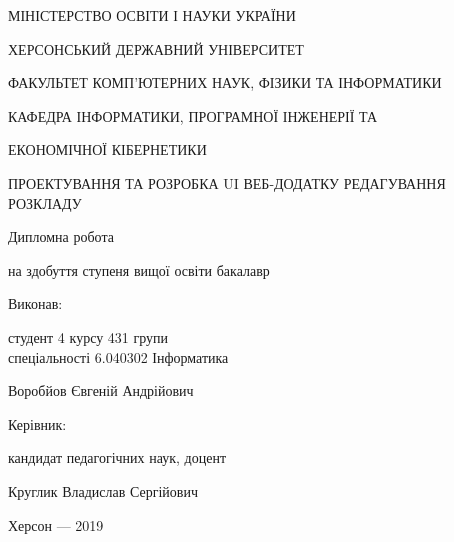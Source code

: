 \thispagestyle{empty}

{\centering
МІНІСТЕРСТВО ОСВІТИ І НАУКИ УКРАЇНИ

ХЕРСОНСЬКИЙ ДЕРЖАВНИЙ УНІВЕРСИТЕТ

ФАКУЛЬТЕТ КОМП'ЮТЕРНИХ НАУК, ФІЗИКИ ТА ІНФОРМАТИКИ

КАФЕДРА ІНФОРМАТИКИ, ПРОГРАМНОЇ ІНЖЕНЕРІЇ ТА 

ЕКОНОМІЧНОЇ КІБЕРНЕТИКИ

\vfill

ПРОЕКТУВАННЯ ТА РОЗРОБКА UI ВЕБ-ДОДАТКУ РЕДАГУВАННЯ РОЗКЛАДУ

Дипломна робота

на здобуття ступеня вищої освіти бакалавр

}

\vfill

\hfill\begin{minipage}[t]{0.6\textwidth}
Виконав: 

студент 4 курсу 431 групи \\ спеціальності 6.040302  Інформатика

Воробйов Євгеній Андрійович

Керівник:

кандидат педагогічних наук, доцент

Круглик Владислав Сергійович

\end{minipage}

\vfill

{\centering
Херсон --- 2019

}